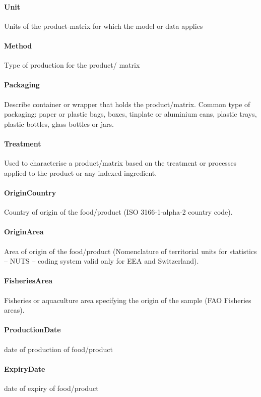 \documentclass[a4paper]{report}
\begin{document}
\paragraph{Unit}
Units of the product-matrix for which the model or data applies

\paragraph{Method}
Type of production for the product/ matrix

\paragraph{Packaging}
Describe container or wrapper that holds the product/matrix. Common type of packaging: paper or plastic bags, boxes, tinplate or aluminium cans, plastic trays, plastic bottles, glass bottles or jars.

\paragraph{Treatment}
Used to characterise a product/matrix based on the treatment or processes applied to the product or any indexed ingredient.

\paragraph{OriginCountry}
Country of origin of the food/product (ISO 3166-1-alpha-2 country code).

\paragraph{OriginArea}
Area of origin of the food/product (Nomenclature of territorial units for statistics – NUTS – coding system valid only for EEA and Switzerland).

\paragraph{FisheriesArea}
Fisheries or aquaculture area specifying the origin of the sample (FAO Fisheries areas).

\paragraph{ProductionDate}
date of production of food/product

\paragraph{ExpiryDate}
date of expiry of food/product
\end{document}
